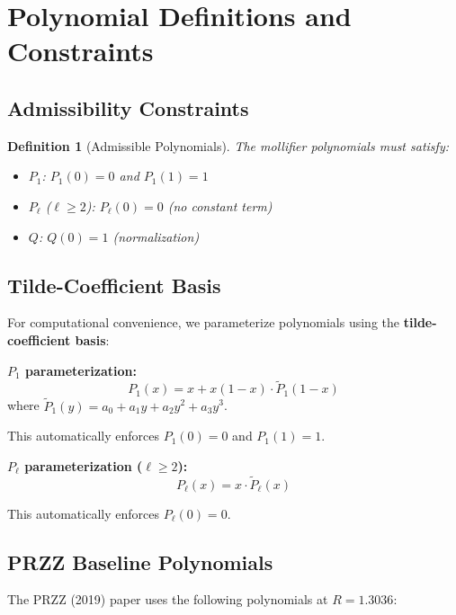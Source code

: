 \documentclass[11pt]{article}
\newtheorem{definition}{Definition}
\begin{document}
\section{Polynomial Definitions and Constraints}
\label{sec:polynomials}

\subsection{Admissibility Constraints}

\begin{definition}[Admissible Polynomials]
The mollifier polynomials must satisfy:
\begin{itemize}
\item $P_1$: $P_1(0) = 0$ and $P_1(1) = 1$
\item $P_\ell$ ($\ell \geq 2$): $P_\ell(0) = 0$ (no constant term)
\item $Q$: $Q(0) = 1$ (normalization)
\end{itemize}
\end{definition}

\subsection{Tilde-Coefficient Basis}

For computational convenience, we parameterize polynomials using the \textbf{tilde-coefficient basis}:

\textbf{$P_1$ parameterization:}
\begin{equation}
P_1(x) = x + x(1-x) \cdot \tilde{P}_1(1-x)
\end{equation}
where $\tilde{P}_1(y) = a_0 + a_1 y + a_2 y^2 + a_3 y^3$.

This automatically enforces $P_1(0) = 0$ and $P_1(1) = 1$.

\textbf{$P_\ell$ parameterization ($\ell \geq 2$):}
\begin{equation}
P_\ell(x) = x \cdot \tilde{P}_\ell(x)
\end{equation}

This automatically enforces $P_\ell(0) = 0$.

\subsection{PRZZ Baseline Polynomials}

The PRZZ (2019) paper uses the following polynomials at $R = 1.3036$:
\end{document}
